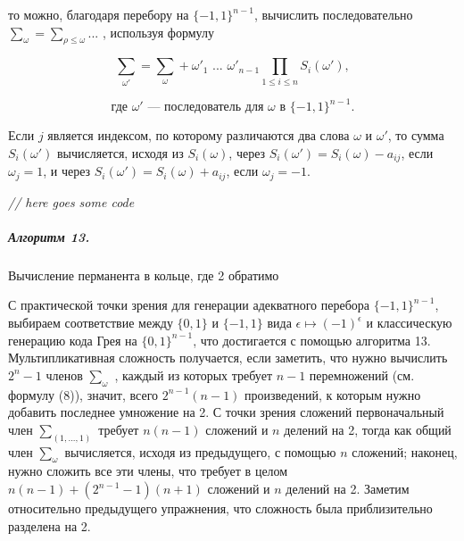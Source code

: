 \documentclass{../../template/mai_book}
\begin{document}
\pagebreak


\noindent
то можно, благодаря перебору на $\{-1, 1\}^{n - 1}$, вычислить последовательно ${\sum}_\omega = {\sum}_{\rho \leq \omega}$... , используя формулу

\begin{equation*}
{\sum}_{\omega'} = {\sum}_\omega + {\omega'}_1 \text{ ... } {\omega'}_{n - 1} \prod_{1 \leq i \leq n} S_i(\omega'),
\end{equation*}

\begin{equation}
\text{где } \omega' \text{ — последователь для } \omega \text{ в } \{-1, 1\}^{n - 1}.
\end{equation}

\noindent
Если $j$ является индексом, по которому различаются два слова $\omega$ и $\omega'$, то сумма $S_i(\omega')$ вычисляется, исходя из $S_i(\omega)$, через $S_i(\omega') = S_i(\omega) - a_{ij}$, если $\omega_j = 1$, и через $S_i(\omega') = S_i(\omega) + a_{ij}$, если $\omega_j = -1$. \newline

\textit{// here goes some code}

\subparagraph{Алгоритм 13.} Вычисление перманента в кольце, где 2 обратимо \newline

С практической точки зрения для генерации адекватного перебора \linebreak $\{-1, 1\}^{n - 1}$, выбираем соответствие между $\{0, 1\}$ и $\{-1, 1\}$ вида $\epsilon \mapsto (-1)^\epsilon$ и классическую генерацию кода Грея на $\{0, 1\}^{n - 1}$, что достигается с помощью алгоритма 13. Мультипликативная сложность получается, если заметить, что нужно вычислить $2^n - 1$ членов ${\sum}_\omega$ , каждый из которых требует $n - 1$ перемножений (см. формулу (8)), значит, всего $2^{n - 1}(n - 1)$ произведений, к которым нужно добавить последнее умножение на 2. С точки зрения сложений первоначальный член ${\sum}_{(1,...,1)}$ требует $n(n - 1)$ сложений и $n$ делений на 2, тогда как общий член ${\sum}_\omega$ вычисляется, исходя из предыдущего, с помощью $n$ сложений; наконец, нужно сложить все эти члены, что требует в целом $n(n - 1) + (2^{n - 1} - 1)(n + 1)$ сложений и $n$ делений на 2. Заметим относительно предыдущего упражнения, что сложность была приблизительно разделена на 2.

\pagebreak
\end{document}
